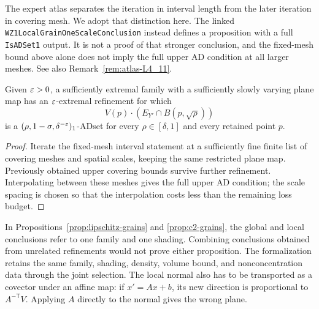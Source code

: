 \begin{remark}
\label{rem:fixed-mesh-ad}
The expert atlas separates the iteration in interval length from the
later iteration in covering mesh. We adopt that distinction here.
The linked \texttt{WZ1LocalGrainOneScaleConclusion} instead defines a
proposition with a full \texttt{IsADSet1} output. It is not a proof
of that stronger conclusion, and the fixed-mesh bound above alone
does not imply the full upper AD condition at all larger meshes.
See also Remark~\ref{rem:atlas-L4_11}.
\end{remark}

\begin{lemma}
\label{lem:local-grains-all-scales}
Given $\varepsilon>0$, a sufficiently extremal family with a sufficiently
slowly varying plane map has an $\varepsilon$-extremal refinement for which
\[
        V(p)\cdot(E_{Y'}\cap B(p,\sqrt\rho))
\]
is a $(\rho,1-\sigma,\delta^{-\varepsilon})_1$-ADset for every
$\rho\in[\delta,1]$ and every retained point $p$.
\end{lemma}
\begin{proof}
Iterate the fixed-mesh interval statement at a sufficiently fine
finite list of covering meshes and spatial scales, keeping the same
restricted plane map. Previously obtained upper covering bounds
survive further refinement. Interpolating between these meshes gives
the full upper AD condition; the scale spacing is chosen so that
the interpolation costs less than the remaining loss budget.
\end{proof}

\begin{remark}
\label{rem:common-grains}
In Propositions~\ref{prop:lipschitz-grains} and
\ref{prop:c2-grains}, the global and local conclusions refer to one
family and one shading. Combining conclusions obtained from unrelated
refinements would not prove either proposition. The formalization
retains the same family, shading, density, volume bound, and
nonconcentration data through the joint selection. The local normal
also has to be transported as a covector under an affine map: if
$x'=Ax+b$, its new direction is proportional to $A^{-\mathsf T}V$.
Applying $A$ directly to the normal gives the wrong plane.
\end{remark}
